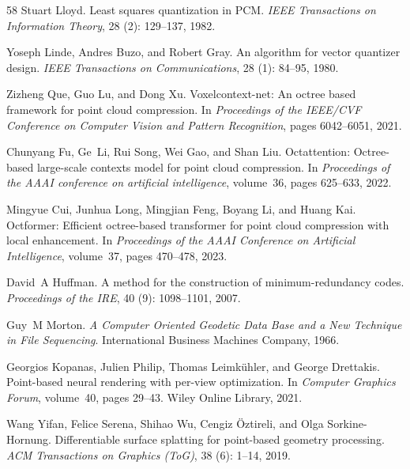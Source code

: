 \documentclass{article}
\begin{document}
\begin{thebibliography}{58}
Stuart Lloyd.
\newblock Least squares quantization in {PCM}.
\newblock \emph{IEEE Transactions on Information Theory}, 28
  (2): 129--137, 1982.

Yoseph Linde, Andres Buzo, and Robert Gray.
\newblock An algorithm for vector quantizer design.
\newblock \emph{IEEE Transactions on Communications}, 28 (1):
  84--95, 1980.

Zizheng Que, Guo Lu, and Dong Xu.
\newblock Voxelcontext-net: An octree based framework for point cloud
  compression.
\newblock In \emph{Proceedings of the IEEE/CVF Conference on Computer Vision
  and Pattern Recognition}, pages 6042--6051, 2021.

Chunyang Fu, Ge~Li, Rui Song, Wei Gao, and Shan Liu.
\newblock Octattention: Octree-based large-scale contexts model for point cloud
  compression.
\newblock In \emph{Proceedings of the AAAI conference on artificial
  intelligence}, volume~36, pages 625--633, 2022.

Mingyue Cui, Junhua Long, Mingjian Feng, Boyang Li, and Huang Kai.
\newblock Octformer: Efficient octree-based transformer for point cloud
  compression with local enhancement.
\newblock In \emph{Proceedings of the AAAI Conference on Artificial
  Intelligence}, volume~37, pages 470--478, 2023.

David~A Huffman.
\newblock A method for the construction of minimum-redundancy codes.
\newblock \emph{Proceedings of the IRE}, 40 (9): 1098--1101,
  2007.

Guy~M Morton.
\newblock \emph{A Computer Oriented Geodetic Data Base and a New Technique in
  File Sequencing}.
\newblock International Business Machines Company, 1966.

Georgios Kopanas, Julien Philip, Thomas Leimk{\"u}hler, and George Drettakis.
\newblock Point-based neural rendering with per-view optimization.
\newblock In \emph{Computer Graphics Forum}, volume~40, pages 29--43. Wiley
  Online Library, 2021.

Wang Yifan, Felice Serena, Shihao Wu, Cengiz {\"O}ztireli, and Olga
  Sorkine-Hornung.
\newblock Differentiable surface splatting for point-based geometry processing.
\newblock \emph{ACM Transactions on Graphics (ToG)}, 38 (6):
  1--14, 2019.


\end{thebibliography}
\end{document}
